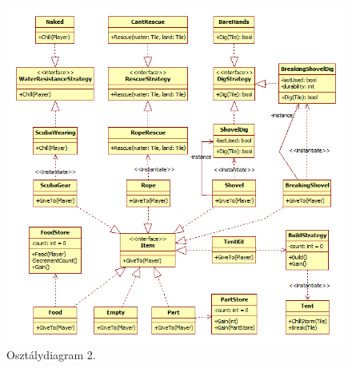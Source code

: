 \begin{figure}[H]
	\begin{center}
		\includegraphics[width=17cm]{chapters/chapter07/ClassDiagramPart2.png}
		\caption{Osztálydiagram 2.}
		\label{fig:OsztalyDiagramPart2}
	\end{center}
\end{figure}

